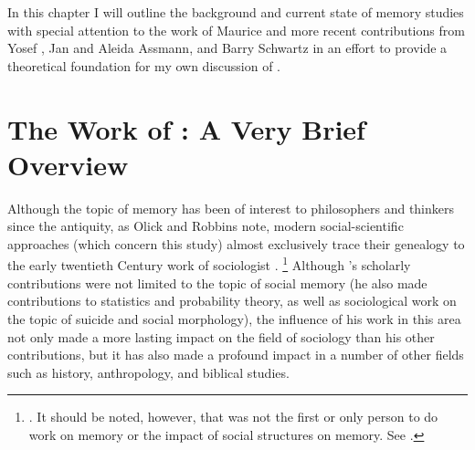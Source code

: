 In this chapter I will outline the background and current state of memory studies with special attention to the work of Maurice \halbwachs and more recent contributions from Yosef \yerushalmi, Jan and Aleida Assmann, and Barry Schwartz in an effort to provide a theoretical foundation for my own discussion of \rwb.

\section{The Work of \Halbwachs: A Very Brief Overview}

Although the topic of memory has been of interest to philosophers and thinkers since the antiquity,\autocite{carruthers_radstone-schwarz2011} as Olick and Robbins note, modern social-scientific approaches (which concern this study) almost exclusively trace their genealogy to the early twentieth Century work of sociologist \Halbwachs.%
%
\footnote{\cite[106]{olick-robbins_ars1998}. It should be noted, however, that \halbwachs was not the first or only person to do work on memory or the impact of social structures on memory. See \cite[8--36]{olick_olick-etal2011}.}
%
Although \halbwachs's scholarly contributions were not limited to the topic of social memory (he also made contributions to statistics and probability theory, as well as sociological work on the topic of suicide and social morphology), the influence of his work in this area not only made a more lasting impact on the field of sociology than his other contributions, but it has also made a profound impact in a number of other fields such as history, anthropology, and biblical studies.\autocite[13--20]{coser_halbwachs1992}

